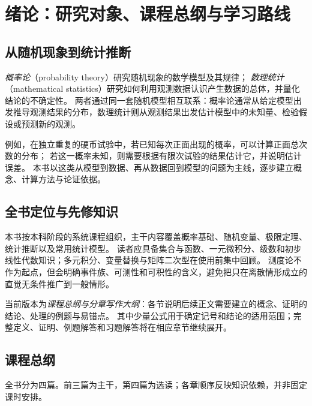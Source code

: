 \chapter*{绪论：研究对象、课程总纲与学习路线}

\section*{从随机现象到统计推断}

\emph{概率论}（probability theory）研究随机现象的数学模型及其规律；
\emph{数理统计}（mathematical statistics）研究如何利用观测数据认识产生数据的总体，并量化结论的不确定性。
两者通过同一套随机模型相互联系：概率论通常从给定模型出发推导观测结果的分布，数理统计则从观测结果出发估计模型中的未知量、检验假设或预测新的观测。

例如，在独立重复的硬币试验中，若已知每次正面出现的概率，可以计算正面总次数的分布；
若这一概率未知，则需要根据有限次试验的结果估计它，并说明估计误差。
本书以这类从模型到数据、再从数据回到模型的问题为主线，逐步建立概念、计算方法与论证依据。

\section*{全书定位与先修知识}

本书按本科阶段的系统课程组织，主干内容覆盖概率基础、随机变量、极限定理、统计推断以及常用统计模型。
读者应具备集合与函数、一元微积分、级数和初步线性代数知识；多元积分、变量替换与矩阵二次型在使用前集中回顾。
测度论不作为起点，但会明确事件族、可测性和可积性的含义，避免把只在离散情形成立的直觉无条件推广到一般情形。

当前版本为\emph{课程总纲与分章写作大纲}：各节说明后续正文需要建立的概念、证明的结论、处理的例题与易错点。
其中少量公式用于确定记号和结论的适用范围；完整定义、证明、例题解答和习题解答将在相应章节继续展开。

\section*{课程总纲}

全书分为四篇。前三篇为主干，第四篇为选读；各章顺序反映知识依赖，并非固定课时安排。

